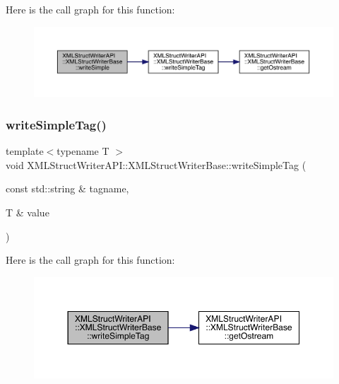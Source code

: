 Here is the call graph for this function\+:
\nopagebreak
\begin{figure}[H]
\begin{center}
\leavevmode
\includegraphics[width=350pt]{db/d4f/classXMLStructWriterAPI_1_1XMLStructWriterBase_a8e5e47c565c73791739d298b697d66f8_cgraph}
\end{center}
\end{figure}
\mbox{\label{classXMLStructWriterAPI_1_1XMLStructWriterBase_a049c80e79c8f64d2b6b0221c01392d37}} 
\subsubsection{\texorpdfstring{writeSimpleTag()}{writeSimpleTag()}\hspace{0.1cm}{\footnotesize\ttfamily [1/3]}}
{\footnotesize\ttfamily template$<$typename T $>$ \\
void X\+M\+L\+Struct\+Writer\+A\+P\+I\+::\+X\+M\+L\+Struct\+Writer\+Base\+::write\+Simple\+Tag (\begin{DoxyParamCaption}\item[{const std\+::string \&}]{tagname,  }\item[{T \&}]{value }\end{DoxyParamCaption})\hspace{0.3cm}{\ttfamily [inline]}}

Here is the call graph for this function\+:
\nopagebreak
\begin{figure}[H]
\begin{center}
\leavevmode
\includegraphics[width=350pt]{db/d4f/classXMLStructWriterAPI_1_1XMLStructWriterBase_a049c80e79c8f64d2b6b0221c01392d37_cgraph}
\end{center}
\end{figure}
\mbox{\label{classXMLStructWriterAPI_1_1XMLStructWriterBase_a049c80e79c8f64d2b6b0221c01392d37}} 
